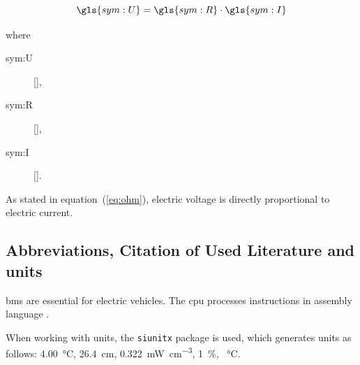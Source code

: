 \begin{equation} 
	\gls{sym:U} = \gls{sym:R} \cdot \gls{sym:I} 
	\label{eq:ohm} 
\end{equation} 

where

\begin{description}
	\item[\gls{sym:U}]  [],
	\item[\gls{sym:R}]  [],
	\item[\gls{sym:I}]  [].
\end{description}

As stated in equation~(\ref{eq:ohm}), electric voltage is directly proportional to electric current.

\subsection{Abbreviations, Citation of Used Literature and units}

\gls{bms} are essential for electric vehicles. The \gls{cpu} processes instructions in assembly language \cite{nuclear_fission_uranium_235, JAYABAL2024103121}.

When working with units, the \texttt{siunitx} package is used, which generates units as follows: \SI{4.00}{\celsius}, \SI{26.4}{\centi\metre}, \SI{0.322}{\milli\watt\per\cubic\centi\metre}, \SI{1}{\percent}, \SI{}{\celsius}.
